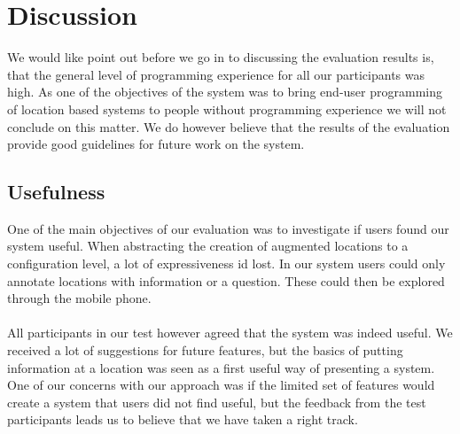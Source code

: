 \section{Discussion} %
\label{sec:discusion}
We would like point out before we go in to discussing the evaluation results is, that the general level of programming experience for all our participants was high. As one of the objectives of the system was to bring end-user programming of location based systems to people without programming experience we will not conclude on this matter. We do however believe that the results of the evaluation provide good guidelines for future work on the system. 

\subsection{Usefulness} %
\label{sub:usefulness}
One of the main objectives of our evaluation was to investigate if users found our system useful. When abstracting the creation of augmented locations to a configuration level, a lot of expressiveness id lost. In our system users could only annotate locations with information or a question. These could then be explored through the mobile phone.
\\\\
All participants in our test however agreed that the system was indeed useful. We received a lot of suggestions for future features, but the basics of putting information at a location was seen as a first useful way of presenting a system. One of our concerns with our approach was if the limited set of features would create a system that users did not find useful, but the feedback from the test participants leads us to believe that we have taken a right track.

